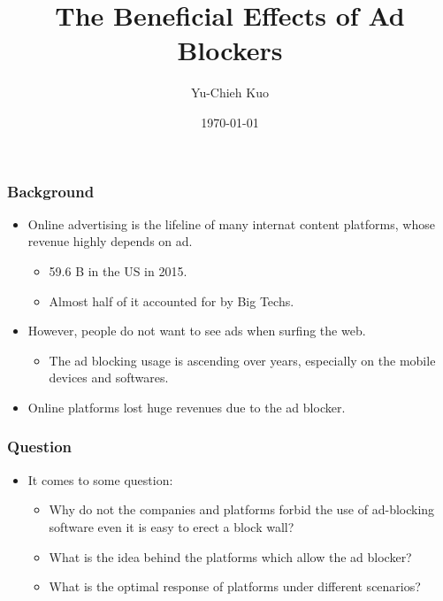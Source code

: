 \documentclass{beamer}
\title{
    The Beneficial Effects of Ad Blockers
}
\author{Yu-Chieh Kuo\inst{1}}
\date{\today}
\institute[NTU]
{
    \inst{1}
    Department of Information Management,
    National Taiwan University
}
\begin{document}
\begin{frame}
\titlepage
\end{frame} 
\begin{frame}
    \frametitle{Background}
    \begin{itemize}
        \item
        Online advertising is the lifeline of many internat content platforms,
        whose revenue highly depends on ad.
        \begin{itemize}
            \item
                59.6 B in the US in 2015.
            \item
                Almost half of it accounted for by Big Techs.
        \end{itemize}
        \item However, people do not want to see ads when surfing the web.
        \begin{itemize}
            \item The ad blocking usage is ascending over years, especially
                on the mobile devices and softwares.
        \end{itemize}
    \item Online platforms lost huge revenues due to the ad blocker.
\end{itemize}
\end{frame}

\begin{frame}
    \frametitle{Question}
    \begin{itemize}
        \item It comes to some question:
        \begin{itemize}
            \item Why do not the companies and platforms forbid the use
            of ad-blocking software even it is easy to erect a block wall?
            \item What is the idea behind the platforms which allow the ad blocker?
            \item What is the optimal response of platforms under different 
            scenarios?
        \end{itemize}
    \end{itemize}
\end{frame}
\end{document}
